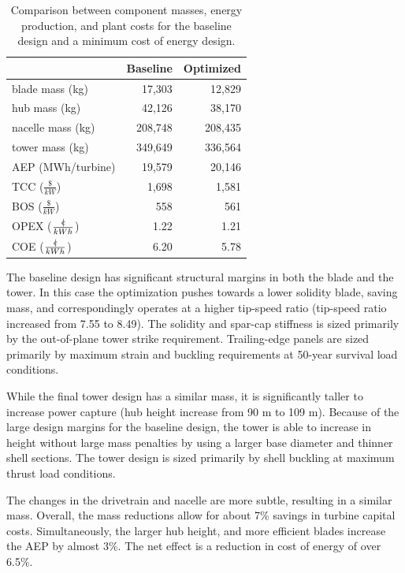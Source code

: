 \documentclass[]{aiaa-tc} %
\newcommand{\cent}{{\mathrm{c}\mkern-6.5mu{\mid}}}
\begin{document}
    \begin{table}[htb]
    \centering
    \caption{Comparison between component masses, energy production, and plant costs for the baseline design and a minimum cost of energy design.}
    \label{tab:wind_results}
    \begin{tabular}{@{}lrr@{}}
    \toprule
     &  Baseline & Optimized  \\
    \midrule
    blade mass (kg) & 17,303 & 12,829  \\
    hub mass (kg) & 42,126 & 38,170  \\
    nacelle mass (kg) & 208,748 & 208,435  \\
    tower mass (kg) & 349,649 & 336,564  \\
    AEP (MWh/turbine) &  19,579 & 20,146  \\
    TCC ($\frac{\$}{kW}$) &  1,698 & 1,581  \\
    BOS ($\frac{\$}{kW}$) &  558 & 561  \\
    OPEX ($\frac{\cent}{kWh}$) &  1.22 & 1.21  \\
    COE ($\frac{\cent}{kWh}$) &  6.20 & 5.78  \\
    \bottomrule
    \end{tabular}
    \end{table}

      The baseline design has significant structural margins in both the blade and the tower.  In this case the optimization pushes towards a lower solidity blade, saving mass, and correspondingly operates at a higher tip-speed ratio (tip-speed ratio increased from 7.55 to 8.49).  The solidity and spar-cap stiffness is sized primarily by the out-of-plane tower strike requirement.  Trailing-edge panels are sized primarily by maximum strain and buckling requirements at 50-year survival load conditions.

      While the final tower design has a similar mass, it is significantly taller to increase power capture (hub height increase from 90 m to 109 m).  Because of the large design margins for the baseline design, the tower is able to increase in height without large mass penalties by using a larger base diameter and thinner shell sections.  The tower design is sized primarily by shell buckling at maximum thrust load conditions.

      The changes in the drivetrain and nacelle are more subtle, resulting in a similar mass.  Overall, the mass reductions allow for about 7\% savings in turbine capital costs.  Simultaneously, the larger hub height, and more efficient blades increase the AEP by almost 3\%.  The net effect is a reduction in cost of energy of over 6.5\%.
\end{document}
